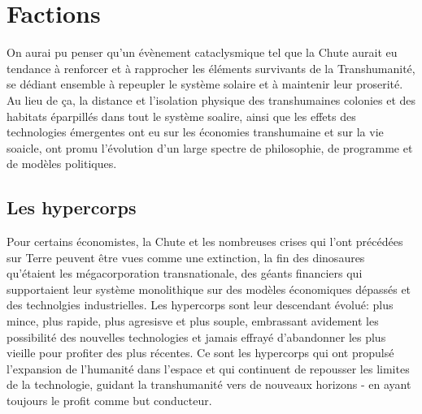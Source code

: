 \section{Factions} \label{sec:factions} 

On aurai pu penser qu'un évènement cataclysmique tel que la Chute aurait eu tendance à renforcer et à rapprocher les éléments survivants de la Transhumanité, se dédiant ensemble à repeupler le système solaire et à maintenir leur proserité. Au lieu de ça, la distance et l'isolation physique des transhumaines colonies et des habitats éparpillés dans tout le système soalire, ainsi que les effets des technologies émergentes ont eu sur les économies transhumaine et sur la vie soaicle, ont promu l'évolution d'un large spectre de philosophie, de programme et de modèles politiques. 

\subsection{Les hypercorps} \label{sec:hypercorps} 

Pour certains économistes, la Chute et les nombreuses crises qui l'ont précédées sur Terre peuvent être vues comme une extinction, la fin des dinosaures qu'étaient les mégacorporation transnationale, des géants financiers qui supportaient leur système monolithique sur des modèles économiques dépassés et des technolgies industrielles. Les hypercorps sont leur descendant évolué: plus mince, plus rapide, plus agresisve et plus souple, embrassant avidement les possibilité des nouvelles technologies et jamais effrayé d'abandonner les plus vieille pour profiter des plus récentes. Ce sont les hypercorps qui ont propulsé l'expansion de l'humanité dans l'espace et qui continuent de repousser les limites de la technologie, guidant la transhumanité vers de nouveaux horizons - en ayant toujours le profit comme but conducteur. 

